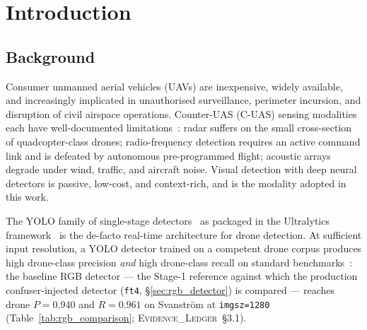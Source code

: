 \chapter{Introduction}
\label{ch:introduction}

\section{Background}

Consumer unmanned aerial vehicles (UAVs) are inexpensive, widely available, and increasingly implicated in unauthorised surveillance, perimeter incursion, and disruption of civil airspace operations. Counter-UAS (C-UAS) sensing modalities each have well-documented limitations~\cite{shi2018counteruas}: radar suffers on the small cross-section of quadcopter-class drones; radio-frequency detection requires an active command link and is defeated by autonomous pre-programmed flight; acoustic arrays degrade under wind, traffic, and aircraft noise. Visual detection with deep neural detectors is passive, low-cost, and context-rich, and is the modality adopted in this work.

The YOLO family of single-stage detectors~\cite{redmon2016yolo} as packaged in the Ultralytics framework~\cite{ultralytics2024} is the de-facto real-time architecture for drone detection. At sufficient input resolution, a YOLO detector trained on a competent drone corpus produces high drone-class precision \emph{and} high drone-class recall on standard benchmarks~\cite{svanstrom2021real,jiang2021antiuav}: the baseline RGB detector --- the Stage-1 reference against which the production confuser-injected detector (\texttt{ft4}, \S\ref{sec:rgb_detector}) is compared --- reaches drone $P=0.940$ and $R=0.961$ on Svanstr\"om at \texttt{imgsz=1280} (Table~\ref{tab:rgb_comparison}; \textsc{Evidence\_Ledger}~\S3.1).

